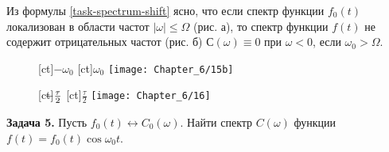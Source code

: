 Из формулы \eqref{task-spectrum-shift} ясно, что если спектр функции $f_0(t)$
локализован в области частот $|\omega|\le\Omega$ (рис.
а),
то спектр функции $f(t)$ не содержит отрицательных частот (рис.
б) $С(\omega)\equiv 0$ при $\omega<0$, если
$\omega_0>\Omega$.




%

\begin{figure}[h!]
    [ct]{$-\omega_0$}
    [ct]{$\omega_0$}
    \texttt{[image: Chapter\_6/15b]}
    \caption{}
\end{figure}
\begin{figure}[h!]
    [ct]{$\llap{$-$}\frac{\tau}{2}$}
    [ct]{$\frac{\tau}{2}$}
    \texttt{[image: Chapter\_6/16]}
    \caption{}
\end{figure}

\textbf{Задача 5.} Пусть $f_0(t)\leftrightarrow C_0(\omega)$. Найти спектр
$C(\omega)$ функции $f(t)=f_0(t)\cos\omega_0t$.

